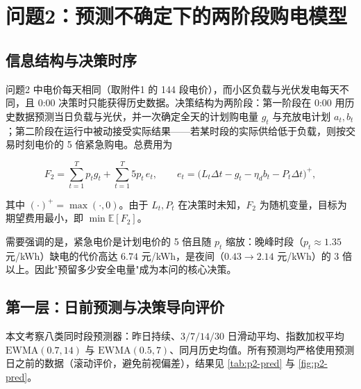 \section{问题2：预测不确定下的两阶段购电模型}

\subsection{信息结构与决策时序}

问题2 中电价每天相同（取附件1 的 144 段电价），而小区负载与光伏发电每天不同，且 0:00 决策时只能获得历史数据。决策结构为两阶段：第一阶段在 0:00 用历史数据预测当日负载与光伏，并一次确定全天的计划购电量 $g_t$ 与充放电计划 $a_t,b_t$；第二阶段在运行中被动接受实际结果——若某时段的实际供给低于负载，则按交易时刻电价的 5 倍紧急购电。总费用为

\begin{equation}
  F_2=\sum_{t=1}^{T}p_tg_t+\sum_{t=1}^{T}5p_t\,e_t,\qquad
  e_t=\big(L_t\Delta t-g_t-\eta_db_t-P_t\Delta t\big)^{+},
  \label{eq:p2-cost}
\end{equation}

其中 $(\cdot)^{+}=\max(\cdot,0)$。由于 $L_t,P_t$ 在决策时未知，$F_2$ 为随机变量，目标为期望费用最小，即 $\min\mathbb{E}[F_2]$。

需要强调的是，紧急电价是计划电价的 5 倍且随 $p_t$ 缩放：晚峰时段（$p_t\approx1.35$ 元/kWh）缺电的代价高达 $6.74$ 元/kWh，是夜间（$0.43\rightarrow2.14$ 元/kWh）的 3 倍以上。因此"预留多少安全电量"成为本问的核心决策。

\subsection{第一层：日前预测与决策导向评价}

本文考察八类同时段预测器\cite{hyndman2021}：昨日持续、$3/7/14/30$ 日滑动平均、指数加权平均 $\mathrm{EWMA}(0.7,14)$ 与 $\mathrm{EWMA}(0.5,7)$、同月历史均值。所有预测均严格使用预测日之前的数据（滚动评价，避免前视偏差），结果见 \cref{tab:p2-pred} 与 \cref{fig:p2-pred}。

